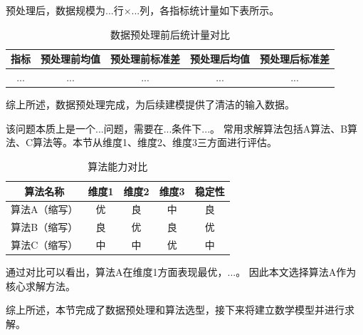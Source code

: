 预处理后，数据规模为...行×...列，各指标统计量如下表所示。

\begin{table}[H]
  \centering
  \caption{数据预处理前后统计量对比}
  \begin{tabularx}{\textwidth}{CCCCC}
    \toprule
    指标 & 预处理前均值 & 预处理前标准差 & 预处理后均值 & 预处理后标准差 \\
    \midrule
    ... & ... & ... & ... & ... \\
    \bottomrule
  \end{tabularx}
  \label{tab:预处理对比}
\end{table}

综上所述，数据预处理完成，为后续建模提供了清洁的输入数据。

该问题本质上是一个...问题，需要在...条件下...。
常用求解算法包括A算法、B算法、C算法等。本节从维度1、维度2、维度3三方面进行评估。

\begin{table}[H]
  \centering
  \caption{算法能力对比}
  \begin{tabularx}{\textwidth}{CCCCC}
    \toprule
    算法名称 & 维度1 & 维度2 & 维度3 & 稳定性 \\
    \midrule
    算法A（缩写） & 优 & 良 & 中 & 良 \\
    算法B（缩写） & 良 & 优 & 良 & 优 \\
    算法C（缩写） & 中 & 中 & 优 & 中 \\
    \bottomrule
  \end{tabularx}
  \label{tab:算法对比1}
\end{table}

通过对比可以看出，算法A在维度1方面表现最优，...。
因此本文选择算法A作为核心求解方法。

综上所述，本节完成了数据预处理和算法选型，接下来将建立数学模型并进行求解。
